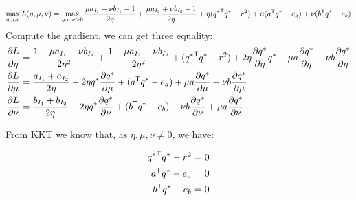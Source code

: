 \begin{equation}
\max_{\eta,\mu,\nu}  L(\eta,\mu,\nu) = \max_{\eta,\mu,\nu>0} \frac{\mu a_{I_1} + \nu b_{I_1}-1}{2\eta}  +\frac{\mu a_{I_2} + \nu b_{I_2}-1}{2\eta}+ \eta({q^{*}}^{\mathsf T}q^{*}-r^2 )+\mu( a^{\mathsf T}q^{*} - e_a ) + \nu( b^{\mathsf T}q^{*} - e_b )
\end{equation}
Compute the gradient, we can get three equality:
\begin{equation}
\begin{split} 
\frac{\partial L}{\partial \eta} &= \frac{1-\mu a_{I_1} - \nu b_{I_1}}{2\eta^2} +  \frac{1-\mu a_{I_2} - \nu b_ {I_2}}{2\eta^2} + ( {q^{*}}^{\mathsf T}q^{*} -r^2) + 2\eta\frac{\partial q^{*}}{\partial \eta}q^{*} +\mu a \frac{\partial q^{*}}{\partial \eta} + \nu b \frac{\partial q^{*}}{\partial \eta}\\
\frac{\partial L}{\partial \mu} &= \frac{a_{I_1} + a_{I_2}}{2\eta} + 2 \eta q^{*}\frac{\partial q^{*}}{\partial \mu} +( a^{\mathsf T}q^{*} - e_a ) + \mu a \frac{\partial q^{*}}{\partial \mu} + \nu b \frac{\partial q^{*}}{\partial \mu} \\
\frac{\partial L}{\partial \nu} &= \frac{b_{I_1} + b_{I_2}}{2\eta} + 2 \eta q^{*}\frac{\partial q^{*}}{\partial \nu} +( b^{\mathsf T}q^{*} - e_b ) + \nu b \frac{\partial q^{*}}{\partial \nu} + \mu a \frac{\partial q^{*}}{\partial \nu} 
 \end{split}
\end{equation}

From KKT we know that, as $\eta,\mu,\nu \neq 0$, we have:

\begin{equation}
\begin{split} 
 {q^{*}}^{\mathsf T}q^{*} -r^2 &= 0\\
  a^{\mathsf T}q^{*} - e_a&= 0\\
  b^{\mathsf T}q^{*} - e_b &=0
 \end{split}
\end{equation}

